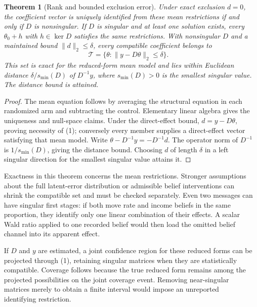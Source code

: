 \documentclass[11pt]{article}
\newtheorem{theorem}{Theorem}
\theoremstyle{definition}
\begin{document}
\begin{theorem}[Rank and bounded exclusion error]
Under exact exclusion $d=0$, the coefficient vector is uniquely identified from these mean restrictions if and only if $D$ is nonsingular. If $D$ is singular and at least one solution exists, every $\theta_0+h$ with $h\in\ker D$ satisfies the same restrictions. With nonsingular $D$ and a maintained bound $\|d\|_2\le\delta$, every compatible coefficient belongs to
\[
 \mathcal T=\{\theta:\|y-D\theta\|_2\le\delta\}.
 \tag{1}
\]
This set is exact for the reduced-form mean model and lies within Euclidean distance $\delta/s_{\min}(D)$ of $D^{-1}y$, where $s_{\min}(D)>0$ is the smallest singular value. The distance bound is attained.
\end{theorem}
\begin{proof}
The mean equation follows by averaging the structural equation in each randomized arm and subtracting the control. Elementary linear algebra gives the uniqueness and null-space claims. Under the direct-effect bound, $d=y-D\theta$, proving necessity of (1); conversely every member supplies a direct-effect vector satisfying that mean model. Write $\theta-D^{-1}y=-D^{-1}d$. The operator norm of $D^{-1}$ is $1/s_{\min}(D)$, giving the distance bound. Choosing $d$ of length $\delta$ in a left singular direction for the smallest singular value attains it.
\end{proof}
Exactness in this theorem concerns the mean restrictions. Stronger assumptions about the full latent-error distribution or admissible belief interventions can shrink the compatible set and must be checked separately. Even two messages can have singular first stages: if both move rate and income beliefs in the same proportion, they identify only one linear combination of their effects. A scalar Wald ratio applied to one recorded belief would then load the omitted belief channel into its apparent effect.

If $D$ and $y$ are estimated, a joint confidence region for these reduced forms can be projected through (1), retaining singular matrices when they are statistically compatible. Coverage follows because the true reduced form remains among the projected possibilities on the joint coverage event. Removing near-singular matrices merely to obtain a finite interval would impose an unreported identifying restriction.
\end{document}
